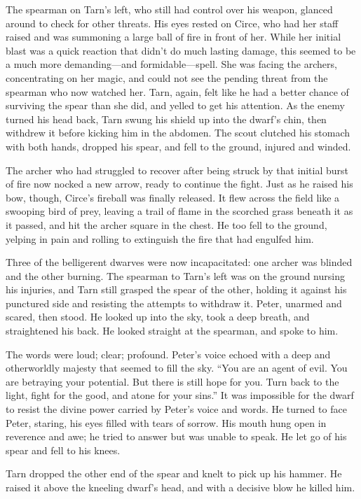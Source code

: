The spearman on Tarn's left, who still had control over his weapon, glanced around to check for other threats.  His eyes rested on Circe, who had her staff raised and was summoning a large ball of fire in front of her.  While her initial blast was a quick reaction that didn't do much lasting damage, this seemed to be a much more demanding---and formidable---spell.  She was facing the archers, concentrating on her magic, and could not see the pending threat from the spearman who now watched her.  Tarn, again, felt like he had a better chance of surviving the spear than she did, and yelled to get his attention.  As the enemy turned his head back, Tarn swung his shield up into the dwarf's chin, then withdrew it before kicking him in the abdomen.  The scout clutched his stomach with both hands, dropped his spear, and fell to the ground, injured and winded.

The archer who had struggled to recover after being struck by that initial burst of fire now nocked a new arrow, ready to continue the fight.  Just as he raised his bow, though, Circe's fireball was finally released.  It flew across the field like a swooping bird of prey, leaving a trail of flame in the scorched grass beneath it as it passed, and hit the archer square in the chest.  He too fell to the ground, yelping in pain and rolling to extinguish the fire that had engulfed him.

Three of the belligerent dwarves were now incapacitated: one archer was blinded and the other burning.  The spearman to Tarn's left was on the ground nursing his injuries, and Tarn still grasped the spear of the other, holding it against his punctured side and resisting the attempts to withdraw it.  Peter, unarmed and scared, then stood.  He looked up into the sky, took a deep breath, and straightened his back.  He looked straight at the spearman, and spoke to him.

The words were loud; clear; profound.  Peter's voice echoed with a deep and otherworldly majesty that seemed to fill the sky.   ``You are an agent of evil.  You are betraying your potential.  But there is still hope for you.  Turn back to the light, fight for the good, and atone for your sins.'' It was impossible for the dwarf to resist the divine power carried by Peter's voice and words.  He turned to face Peter, staring, his eyes filled with tears of sorrow.  His mouth hung open in reverence and awe; he tried to answer but was unable to speak.  He let go of his spear and fell to his knees.

Tarn dropped the other end of the spear and knelt to pick up his hammer.  He raised it above the kneeling dwarf's head, and with a decisive blow he killed him.

